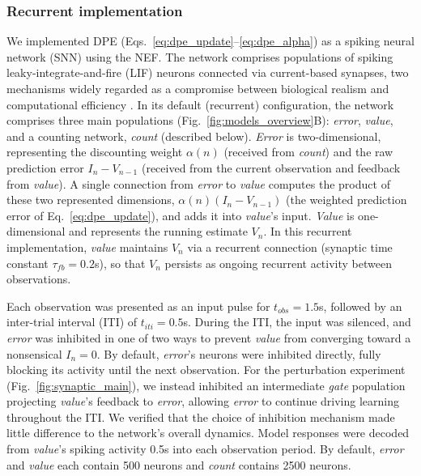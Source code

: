 \documentclass[12pt]{article}
\begin{document}
\subsubsection*{Recurrent implementation}
We implemented DPE (Eqs.~\ref{eq:dpe_update}--\ref{eq:dpe_alpha}) as a spiking neural network (SNN) using the NEF. The network comprises populations of spiking leaky-integrate-and-fire (LIF) neurons connected via current-based synapses, two mechanisms widely regarded as a compromise between biological realism and computational efficiency \cite{eliasmith2013build, duggins2022constructing, gerstner2014neuronal, dayan2005theoretical}. In its default (recurrent) configuration, the network comprises three main populations (Fig.~\ref{fig:models_overview}B): \textit{error}, \textit{value}, and a counting network, \textit{count} (described below). \textit{Error} is two-dimensional, representing the discounting weight $\alpha(n)$ (received from \textit{count}) and the raw prediction error $I_n - V_{n-1}$ (received from the current observation and feedback from \textit{value}). A single connection from \textit{error} to \textit{value} computes the product of these two represented dimensions, $\alpha(n)(I_n-V_{n-1})$ (the weighted prediction error of Eq.~\ref{eq:dpe_update}), and adds it into \textit{value}'s input. \textit{Value} is one-dimensional and represents the running estimate $V_n$. In this recurrent implementation, \textit{value} maintains $V_n$ via a recurrent connection (synaptic time constant $\tau_{fb}=0.2$s), so that $V_n$ persists as ongoing recurrent activity between observations.

Each observation was presented as an input pulse for $t_{obs}=1.5$s, followed by an inter-trial interval (ITI) of $t_{iti}=0.5$s. During the ITI, the input was silenced, and \textit{error} was inhibited in one of two ways to prevent \textit{value} from converging toward a nonsensical $I_n=0$. By default, \textit{error}'s neurons were inhibited directly, fully blocking its activity until the next observation. For the perturbation experiment (Fig.~\ref{fig:synaptic_main}), we instead inhibited an intermediate \textit{gate} population projecting \textit{value}'s feedback to \textit{error}, allowing \textit{error} to continue driving learning throughout the ITI. We verified that the choice of inhibition mechanism made little difference to the network's overall dynamics. Model responses were decoded from \textit{value}'s spiking activity 0.5s into each observation period. By default, \textit{error} and \textit{value} each contain 500 neurons and \textit{count} contains 2500 neurons.
\end{document}
